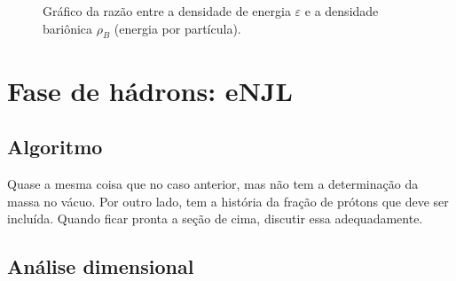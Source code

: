 \begin{figure}
	
	\caption{Gráfico da razão entre a densidade de energia $\varepsilon$ e a densidade bariônica $\rho_B$ (energia por partícula). \protect}
	\label{Fig:energy_density_per_particle_NJL-D_1}
\end{figure}

\FloatBarrier


\section{Fase de hádrons: eNJL}

\subsection{Algoritmo}

Quase a mesma coisa que no caso anterior, mas não tem a determinação da massa no vácuo. Por outro lado, tem a história da fração de prótons que deve ser incluída. Quando ficar pronta a seção de cima, discutir essa adequadamente.

\subsection{Análise dimensional}

